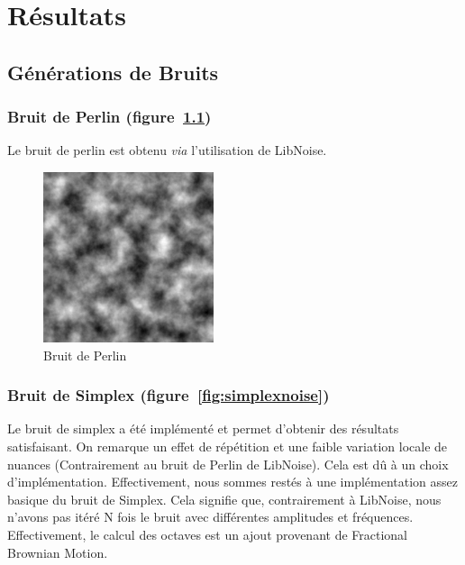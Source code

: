 \chapter{Résultats}

\section{Générations de Bruits}

\subsection{Bruit de Perlin (figure~\ref{fig:perlin_ref})}
Le bruit de perlin est obtenu \textit{via} l'utilisation de LibNoise.

\begin{figure}[!ht]
    \begin{center}
	\includegraphics[width=5cm]{resources/perlin_ref.png}
        \caption{Bruit de Perlin}
        \label{fig:perlin_ref}	
    \end{center}
\end{figure}


\subsection{Bruit de Simplex (figure~\ref{fig:simplexnoise})}
Le bruit de simplex a été implémenté et permet d'obtenir des résultats satisfaisant. 
On remarque un effet de répétition et une faible variation locale de nuances (Contrairement au bruit de Perlin de LibNoise).
Cela est dû à un choix d'implémentation. Effectivement, nous sommes restés à une implémentation assez basique du bruit de Simplex.
Cela signifie que, contrairement à LibNoise, nous n'avons pas itéré N fois le bruit avec différentes amplitudes et fréquences.
Effectivement, le calcul des octaves est un ajout provenant de Fractional Brownian Motion.

